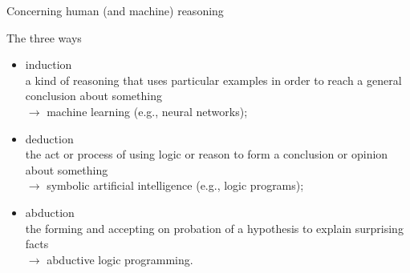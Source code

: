 \documentclass[presentation]{beamer}\mode<presentation>{\usetheme{AMSBolognaFC}}
\begin{document}
\begin{frame}[c]{Concerning human (and machine) reasoning}
    
    \begin{block}{The three ways}
        \begin{itemize}
            \item \alert{induction}\\
            a kind of reasoning that uses particular examples in order to reach a general conclusion about something\\
            $\rightarrow$ machine learning (e.g., neural networks);
            \item \alert{deduction}\\
            the act or process of using logic or reason to form a conclusion or opinion about something\\
            $\rightarrow$ symbolic artificial intelligence (e.g., logic programs);
            \item \alert{abduction}\\
            the forming and accepting on probation of a hypothesis to explain surprising facts\\
            $\rightarrow$ abductive logic programming.
        \end{itemize}
    \end{block}

\end{frame}
\end{document}
